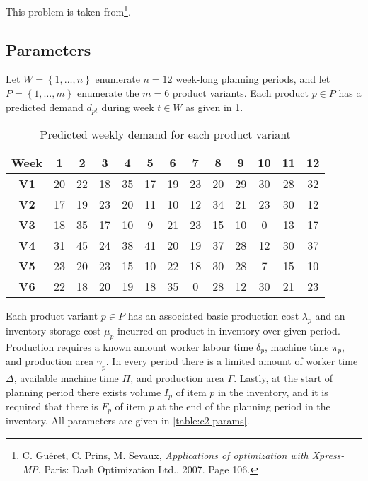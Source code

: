 \documentclass[8pt,oneside]{extarticle}
\begin{document}
This problem is taken from\footnote{C. Guéret, C. Prins, M. Sevaux, \textit{Applications of optimization with Xpress-MP}. %
Paris: Dash Optimization Ltd., 2007. Page 106.}.

\subsection{Parameters}

Let $W =\left\lbrace 1,\ldots, n\right\rbrace$ enumerate $n=12$ week-long planning
periods, and let $P=\left\lbrace 1,\ldots, m\right\rbrace$ enumerate the $m=6$
product variants. Each product $p\in P$ has a predicted demand $d_{pt}$ during week
$t\in W$ as given in \cref{table:c2-demands}.

\begin{table}[h]
    \center
    \caption{Predicted weekly demand for each product variant}\label{table:c2-demands}
    \begin{tabular}{c cccccccccccc}
        \hline
        \textbf{Week} & \textbf{1} &\textbf{2} &\textbf{3} &\textbf{4} &\textbf{5} &\textbf{6} &\textbf{7} &\textbf{8} &\textbf{9} &\textbf{10} &\textbf{11} &\textbf{12} \\
        \hline
        \textbf{V1} & 20 & 22 & 18 & 35 & 17 & 19 & 23 & 20 & 29 & 30 & 28 & 32 \\
        \textbf{V2} & 17 & 19 & 23 & 20 & 11 & 10 & 12 & 34 & 21 & 23 & 30 & 12 \\
        \textbf{V3} & 18 & 35 & 17 & 10 & 9  & 21 & 23 & 15 & 10 & 0 & 13 & 17 \\
        \textbf{V4} & 31 & 45 & 24 & 38 & 41 & 20 & 19 & 37 & 28 & 12 & 30 & 37 \\
        \textbf{V5} & 23 & 20 & 23 & 15 & 10 & 22 & 18 & 30 & 28 & 7 & 15 & 10 \\
        \textbf{V6} & 22 & 18 & 20 & 19 & 18 & 35 & 0 & 28 & 12 & 30 & 21 & 23 \\
        \hline
    \end{tabular}
\end{table}

Each product variant $p\in P$ has an associated basic production cost $\lambda_p$
and an inventory storage cost $\mu_p$ incurred on product in inventory over
given period. Production requires a known amount worker labour time $\delta_p$,
machine time $\pi_p$, and production area $\gamma_p$. In every period there
is a limited amount of worker time $\Delta$, available machine time $\Pi$, and
production area $\Gamma$. Lastly, at the start of planning period there exists volume 
$I_p$ of item $p$ in the inventory, and it is required that there is $F_p$ of item
$p$ at the end of the planning period in the inventory. All parameters are given in
\cref{table:c2-params}.
\end{document}
